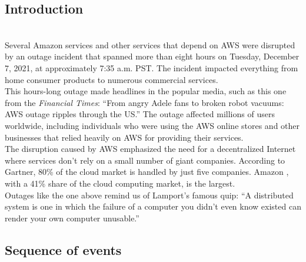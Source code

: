 

\subsection{Introduction}\label{FVqL_6vSo2Q8ZMnPSuWGe}
\\
Several Amazon services and other services that depend on AWS were disrupted by an outage incident that spanned more than eight hours on Tuesday, December 7, 2021, at approximately 7:35 a.m. PST. The incident impacted everything from home consumer products to numerous commercial services.
\\
This hours-long outage made headlines in the popular media, such as this one from the \emph{Financial Times}: ``From angry Adele fans to broken robot vacuums: AWS outage ripples through the US.'' The outage affected millions of users worldwide, including individuals who were using the AWS online stores and other businesses that relied heavily on AWS for providing their services.
\\
The disruption caused by AWS emphasized the need for a decentralized Internet where services don't rely on a small number of giant companies. According to Gartner, 80\% of the cloud market is handled by just five companies. Amazon , with a 41\% share of the cloud computing market, is the largest.
\\
Outages like the one above remind us of Lamport's famous quip: ``A distributed system is one in which the failure of a computer you didn't even know existed can render your own computer unusable.''

\subsection{Sequence of events}\label{QeEP2UgNlr9Fo757JyPsc}

